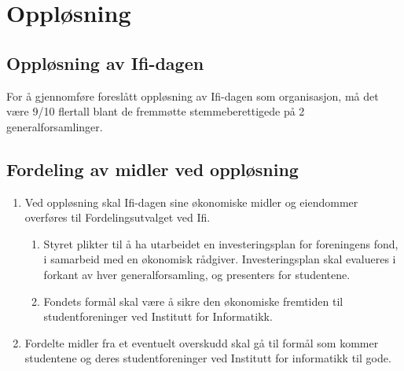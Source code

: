 \documentclass[norsk,a4paper]{article}
\begin{document}
\section{Oppløsning}
\subsection{Oppløsning av Ifi-dagen}
        For å gjennomføre foreslått oppløsning av Ifi-dagen som organisasjon, må det være 9/10 flertall
        blant de fremmøtte stemmeberettigede på 2 generalforsamlinger.
\subsection{Fordeling av midler ved oppløsning}
\begin{enumerate}
        \item{Ved oppløsning skal Ifi-dagen sine økonomiske midler og eiendommer overføres til Fordelingsutvalget ved Ifi.}
        \begin{enumerate}
            \item Styret plikter til å ha utarbeidet en investeringsplan for foreningens fond, i samarbeid med en økonomisk rådgiver. Investeringsplan skal evalueres i forkant av hver generalforsamling, og presenters for studentene.
            \item Fondets formål skal være å sikre den økonomiske fremtiden til studentforeninger ved Institutt for Informatikk.
        \end{enumerate}
        \item{Fordelte midler fra et eventuelt overskudd skal gå til formål som kommer studentene og deres studentforeninger ved Institutt for informatikk til gode.}
\end{enumerate}
\end{document}
